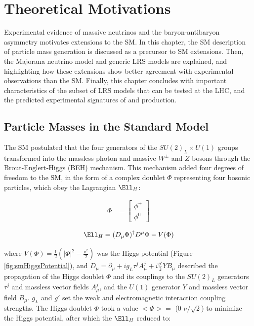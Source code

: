 \chapter{Theoretical Motivations}
\label{wrBosonAndHeavyNu}
Experimental evidence of massive neutrinos and the baryon-antibaryon asymmetry motivates extensions to the SM.  
In this chapter, the SM description of particle mass generation is discussed as a precursor to SM extensions.  
Then, the Majorana neutrino model and generic LRS models are explained, and highlighting how these extensions 
show better agreement with experimental observations than the SM.  Finally, this chapter concludes with 
important characteristics of the subset of LRS models that can be tested at the LHC, and the predicted experimental 
signatures of \WR and \nul production.

\section{Particle Masses in the Standard Model}
\label{sec:massInSM}
The SM postulated that the four generators of the $SU(2)_{L} \times U(1)$ groups transformed into the massless 
photon and massive $W^{\pm}$ and $Z$ bosons through the Brout-Englert-Higgs (BEH) mechanism.  This mechanism 
added four degrees of freedom to the SM, in the form of a complex doublet $\Phi$ representing four bosonic 
particles, which obey the Lagrangian $\Ell_{H}$:

\begin{align}
	\Phi &= \begin{bmatrix}
	\phi^{+} \\
	\phi^{0}
	\end{bmatrix}
\end{align}

\begin{equation}
	\Ell_{H} = (D_{\mu}\Phi)^{\dagger}D^{\mu}\Phi - V(\Phi)
\end{equation}

where $V(\Phi) = \frac{1}{2}(|\Phi|^{2} - \frac{\nu^{2}}{2})$ was the Higgs potential (Figure \ref{fig:smHiggsPotential}), and 
$D_{\mu} = \partial_{\mu} + ig_{L}\tau^{j}A^{j}_{\mu} + i\frac{g'}{2}YB_{\mu}$ described the propagation 
of the Higgs doublet $\Phi$ and its couplings to the $SU(2)_L$ generators $\tau^{j}$ and massless vector 
fields $A^{j}_{\mu}$, and the $U(1)$ generator $Y$ and massless vector field $B_{\mu}$.  $g_{L}$ and 
$g'$ set the weak and electromagnetic interaction coupling strengths.  The Higgs doublet $\Phi$ took a 
value $<\Phi> =$ (0  $\nu/\sqrt{2}$) to minimize the Higgs potential, after which the $\Ell_{H}$ reduced 
to:

